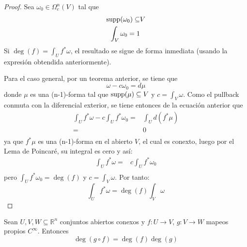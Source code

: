 \documentclass[12pt]{report}
\theoremstyle{largebreak}
\begin{document}
    \begin{proof}
        Sea $\omega_0\in\Omega_c^n(V)$ tal que
        \begin{equation*}
            \begin{split}
                \textup{supp}(\omega_0)\subseteq& V\\
                \int_{V}\omega_0 =1
            \end{split}
        \end{equation*}
        Si $\deg(f)=\int_{U}f^*\omega$, el resultado se sigue de forma inmediata (usando la expresión obtendida anteriormente).
        
        Para el caso general, por un teorema anterior, se tiene que
        \begin{equation*}
            \omega -c\omega_0 = d\mu
        \end{equation*}
        donde $\mu$ es una (n-1)-forma tal que $\textup{supp}(\mu)\subseteq V$ y $c=\int_{V}\omega$. Como el pullback conmuta con la diferencial exterior, se tiene entonces de la ecuación anterior que
        \begin{equation*}
            \begin{split}
                \int_{U}f^*\omega-c\int_{U}f^*\omega_0 =& \int_{U}d(f^*\mu)\\
                =& 0\\
            \end{split}
        \end{equation*}
        ya que $f^*\mu$ es una (n-1)-forma en el abierto $V$, el cual es conexto, luego por el Lema de Poincaré, su integral es cero y así:
        \begin{equation*}
            \begin{split}
                \int_{U}f^*\omega=&c\int_{U}f^*\omega_0\\
            \end{split}
        \end{equation*}
        pero $\int_{U}f^*\omega_0=\deg(f)$ y $c=\int_{V}\omega$. Por tanto:
        \begin{equation}
            \int_{U}f^*\omega=\deg(f)\int_{V}\omega
        \end{equation}
    \end{proof}
    \begin{propo}
        Sean $U,V,W\subseteq \mathbb{R}^n$ conjuntos abiertos conexos y $f:U\rightarrow V$, $g:V \rightarrow W$ mapeos propios $C^\infty$. Entonces
        \begin{equation}
            \deg(g\circ f)=\deg(f)\deg(g)\label{equation:mult_p_deg}
        \end{equation}
    \end{propo}
\end{document}

